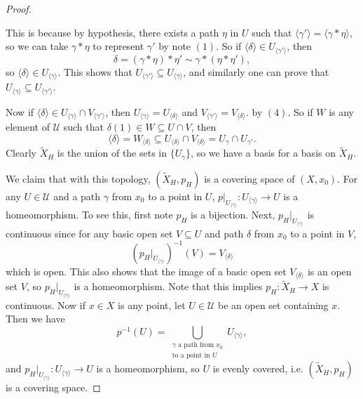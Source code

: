 \begin{proof}
\begin{enumerate}
      This is because by hypothesis, there exists
      a path $\eta$ in $U$ such that
      $\langle \gamma' \rangle = \langle \gamma * \eta \rangle$,
      so we can take $\gamma * \eta$ to represent
      $\gamma'$ by note $(1)$. So if
      $\langle \delta \rangle \in U_{\langle \gamma' \rangle}$, then
      \[
        \delta = (\gamma * \eta) * \eta'
       \sim \gamma * (\eta * \eta'),
      \]
      so $\langle \delta \rangle \in U_{\langle \gamma \rangle}$.
      This shows that $U_{\langle \gamma' \rangle} \subseteq U_{\langle \gamma \rangle}$, and
      similarly one can prove that $U_{\langle \gamma \rangle} \subseteq U_{\langle \gamma' \rangle}$.
  \end{enumerate}
  Now if $\langle \delta \rangle \in U_{\langle \gamma \rangle} \cap V_{\langle \gamma' \rangle}$, then
  $U_{\langle \gamma \rangle} = U_{\langle \delta \rangle}$
  and $V_{\langle \gamma' \rangle} = V_{\langle \delta \rangle}$.
  by $(4)$. So if
  $W$ is any element of $\mathcal{U}$ such that
  $\delta(1) \in W \subseteq U \cap V$, then
  \[\langle \delta \rangle = W_{\langle \delta \rangle} \subseteq U_{\langle \delta \rangle} \cap V_{\langle \delta \rangle} = U_{\gamma} \cap U_{\gamma'}.\]
  Clearly $\widetilde{X}_H$ is the union of the sets
  in $\{U_{\gamma}\}$, so we have a basis for a basis
  on $\widetilde{X}_H$.

  We claim that with this topology,
  $(\widetilde{X}_H, p_H)$ is a covering
  space of $(X, x_0)$. For any
  $U \in \mathcal{U}$ and a path $\gamma$ from
  $x_0$ to a point in $U$,
  $p|_{U_{\langle \gamma \rangle}} : U_{\langle \gamma \rangle} \to U$ is a homeomorphism.
  To see this, first note $p_H$ is a bijection.
  Next, $p_H|_{U_{\langle \gamma \rangle}}$ is continuous
  since for any basic open set $V \subseteq U$ and
  path $\delta$ from $x_0$ to a point in $V$,
  \[
    (p_H|_{U_{\langle \gamma \rangle}})^{-1}(V) = V_{\langle \delta \rangle}
  \]
  which is open. This also shows that
  the image of a basic open set $V_{\langle \delta \rangle}$
  is an open set $V$, so $p_H|_{U_{\langle \gamma \rangle}}$
  is a homeomorphism. Note that this implies
  $p_H : \widetilde{X}_H \to X$ is continuous.
  Now if $x \in X$ is any point, let
  $U \in \mathcal{U}$ be an open set containing $x$.
  Then we have
  \[
    p^{-1}(U) = \bigcup_{\substack{\gamma \text{ a path from $x_0$} \\ \text{to a point in $U$}}} U_{\langle \gamma \rangle},
  \]
  and $p_H|_{U_{\langle \gamma \rangle}} : U_{\langle \gamma \rangle} \to U$ is a homeomorphism, so
  $U$ is evenly covered, i.e.
  $(\widetilde{X}_H, p_H)$ is a covering space.


\end{proof}
